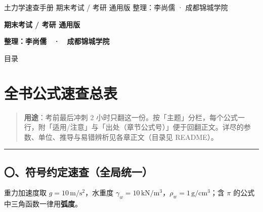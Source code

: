 \documentclass[
]{article}
\author{}
\date{}
\begin{document}
\begin{center}
\vspace{3.5cm}
{\fontsize{26pt}{34pt}\selectfont\heiti 土力学速查手册}
\vspace{1.2cm}
{\fontsize{15pt}{20pt}\selectfont 期末考试 / 考研 通用版}
\vspace{2.8cm}
{\fontsize{15pt}{20pt}\selectfont\kaishu 整理：李尚儒 · 成都锦城学院}
\end{center}
\newpage

\textbf{期末考试 / 考研 通用版}

\textbf{整理：李尚儒　·　成都锦城学院}

\newpage

\setcounter{tocdepth}{1}
\begin{center}
{\fontsize{18pt}{24pt}\selectfont\heiti 目录}
\end{center}
\tableofcontents

\newpage

\section{全书公式速查总表}\label{ux5168ux4e66ux516cux5f0fux901fux67e5ux603bux8868}

\begin{quote}
\textbf{用途}：考前最后冲刺 2
小时只翻这一份。按「主题」分栏，每个公式一行，附「适用/注意」与「出处（章节公式号）」便于回翻正文。详尽的参数、单位、推导与易错辨析见各章正文（目录见
README）。
\end{quote}

\begin{center}\rule{0.5\linewidth}{0.5pt}\end{center}

\subsection{〇、符号约定速查（全局统一）}\label{ux7b26ux53f7ux7ea6ux5b9aux901fux67e5ux5168ux5c40ux7edfux4e00}

重力加速度取 \(g=10\,\mathrm{m/s^2}\)，水重度
\(\gamma_w=10\,\mathrm{kN/m^3}\)，\(\rho_w=1\,\mathrm{g/cm^3}\)；含
\(\pi\) 的公式中三角函数一律用\textbf{弧度}。
\end{document}
